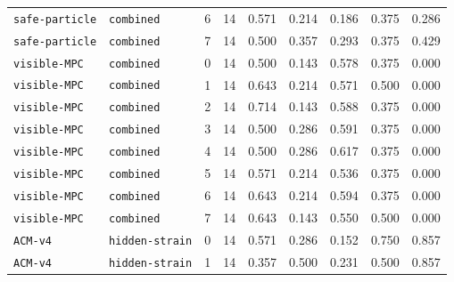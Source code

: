 \documentclass{article}
\begin{document}
\begin{center}
\begin{tabular}{llccccccc}
\texttt{safe-particle} & \texttt{combined} & 6 & 14 & 0.571 & 0.214 & 0.186 & 0.375 & 0.286 \\
\texttt{safe-particle} & \texttt{combined} & 7 & 14 & 0.500 & 0.357 & 0.293 & 0.375 & 0.429 \\
\texttt{visible-MPC} & \texttt{combined} & 0 & 14 & 0.500 & 0.143 & 0.578 & 0.375 & 0.000 \\
\texttt{visible-MPC} & \texttt{combined} & 1 & 14 & 0.643 & 0.214 & 0.571 & 0.500 & 0.000 \\
\texttt{visible-MPC} & \texttt{combined} & 2 & 14 & 0.714 & 0.143 & 0.588 & 0.375 & 0.000 \\
\texttt{visible-MPC} & \texttt{combined} & 3 & 14 & 0.500 & 0.286 & 0.591 & 0.375 & 0.000 \\
\texttt{visible-MPC} & \texttt{combined} & 4 & 14 & 0.500 & 0.286 & 0.617 & 0.375 & 0.000 \\
\texttt{visible-MPC} & \texttt{combined} & 5 & 14 & 0.571 & 0.214 & 0.536 & 0.375 & 0.000 \\
\texttt{visible-MPC} & \texttt{combined} & 6 & 14 & 0.643 & 0.214 & 0.594 & 0.375 & 0.000 \\
\texttt{visible-MPC} & \texttt{combined} & 7 & 14 & 0.643 & 0.143 & 0.550 & 0.500 & 0.000 \\
\texttt{ACM-v4} & \texttt{hidden-strain} & 0 & 14 & 0.571 & 0.286 & 0.152 & 0.750 & 0.857 \\
\texttt{ACM-v4} & \texttt{hidden-strain} & 1 & 14 & 0.357 & 0.500 & 0.231 & 0.500 & 0.857 \\
\bottomrule
\end{tabular}
\end{center}
\end{document}
